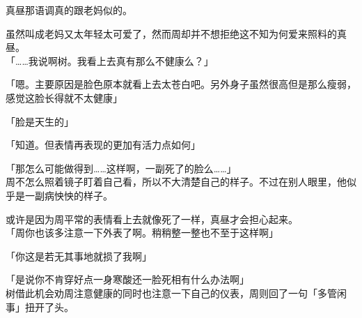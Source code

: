 真昼那语调真的跟老妈似的。

虽然叫成老妈又太年轻太可爱了，然而周却并不想拒绝这不知为何爱来照料的真昼。\\

「……我说啊树。我看上去真有那么不健康么？」

「嗯。主要原因是脸色原本就看上去太苍白吧。另外身子虽然很高但是那么瘦弱，感觉这脸长得就不太健康」

「脸是天生的」

「知道。但表情再表现的更加有活力点如何」

「那怎么可能做得到……这样啊，一副死了的脸么……」\\

周不怎么照着镜子盯着自己看，所以不大清楚自己的样子。不过在别人眼里，他似乎是一副病怏怏的样子。

或许是因为周平常的表情看上去就像死了一样，真昼才会担心起来。\\

「周你也该多注意一下外表了啊。稍稍整一整也不至于这样啊」

「你这是若无其事地就损了我啊」

「是说你不肯穿好点一身寒酸还一脸死相有什么办法啊」\\

树借此机会劝周注意健康的同时也注意一下自己的仪表，周则回了一句「多管闲事」扭开了头。

